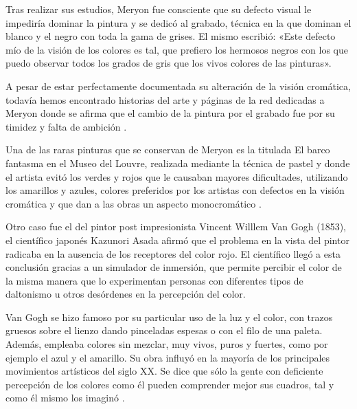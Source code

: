 \documentclass[10pt]{article}
\begin{document}
\setlength{\parskip}{2mm}

Tras realizar sus estudios, Meryon fue consciente que su defecto visual le impediría dominar la pintura y se dedicó al grabado, técnica en la que dominan el blanco y el negro con toda la gama de grises. El mismo escribió: «Este defecto mío de la visión de los colores es tal, que prefiero los hermosos negros con los que puedo observar todos los grados de gris que los vivos colores de las pinturas».

\setlength{\parskip}{2mm}

A pesar de estar perfectamente documentada su alteración de la visión cromática, todavía hemos encontrado historias del arte y páginas de la red dedicadas a Meryon donde se afirma que el cambio de la pintura por el grabado fue por su timidez y falta de ambición \cite{IEEEreferencias:Ref5}.

\setlength{\parskip}{2mm}

Una de las raras pinturas que se conservan de Meryon es la titulada El barco fantasma en el Museo del Louvre, realizada mediante la técnica de pastel y donde el artista evitó los verdes y rojos que le causaban mayores dificultades, utilizando los amarillos y azules, colores preferidos por los artistas con defectos en la visión cromática y que dan a las obras un aspecto monocromático \cite{IEEEreferencias:Ref5}.

\setlength{\parskip}{2mm}

Otro caso fue el del  pintor post impresionista Vincent Willlem Van Gogh (1853), el científico japonés Kazunori Asada afirmó que el problema en la vista del pintor radicaba en la ausencia de los receptores del color rojo. El científico llegó a esta conclusión gracias a un simulador de inmersión, que permite percibir el color de la misma manera que lo experimentan personas con diferentes tipos de daltonismo u otros desórdenes en la percepción del color.

\setlength{\parskip}{2mm}

Van Gogh se hizo famoso por su particular uso de la luz y el color, con trazos gruesos sobre el lienzo dando pinceladas espesas o con el filo de una paleta. Además, empleaba colores sin mezclar, muy vivos, puros y fuertes, como por ejemplo el azul y el amarillo. Su obra influyó en la mayoría de los principales movimientos artísticos del siglo XX. Se dice que sólo la gente con deficiente percepción de los colores como él pueden comprender mejor sus cuadros, tal y como él mismo los imaginó \cite{IEEEreferencias:Ref6}.
\end{document}

